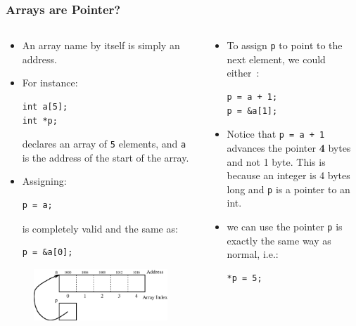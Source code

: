 

\begin{frame}[fragile]
\frametitle{Arrays are Pointer?}
\begin{columns}[T]

\begin{column}{0.45\textwidth}
\begin{itemize}[<+->]
\item An array name by itself is simply an address.
\item 
For instance:
\begin{verbatim}
int a[5];
int *p;
\end{verbatim}
declares an array of \verb^5^ elements, and
\verb^a^ is the address of the start of the
array.
\item
Assigning:
\begin{verbatim}
p = a;
\end{verbatim}
is completely valid and
the same as:
\begin{verbatim}
p = &a[0];
\end{verbatim}
\end{itemize}
\begin{center}
\begin{figure}[ht]
\centerline{
\includegraphics[scale=0.25]{../Figs/array9_2.eps}
}
\end{figure}
\end{center}
\end{column}


\pause
\begin{column}{0.45\textwidth}
\begin{itemize}[<+->]
\item To assign \verb^p^ to point to the next element,
we could either~:
\begin{verbatim}
p = a + 1;
p = &a[1];
\end{verbatim}
\item Notice that \verb^p = a + 1^ advances
the pointer {\bf 4} bytes and not 1 byte.
This is because an integer is 4 bytes long and
\verb^p^ is a pointer to an int.
\item we can use the pointer \verb^p^ is exactly
the same way as normal, i.e.:
\begin{verbatim}
*p = 5;
\end{verbatim}
\end{itemize}
\end{column}

\end{columns}
\end{frame}

